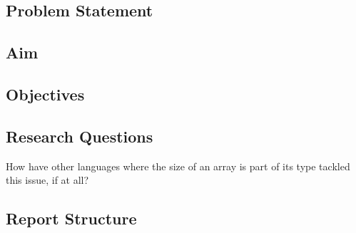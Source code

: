 

\subsection{Problem Statement}


\subsection{Aim}


\subsection{Objectives}


\subsection{Research Questions}

How have other languages where the size of an array is part of its type tackled
this issue, if at all?

\subsection{Report Structure}
